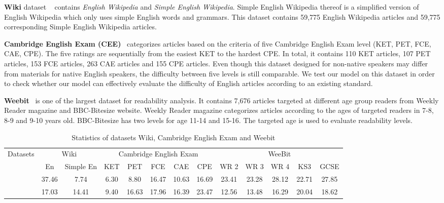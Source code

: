 \documentclass[runningheads]{llncs}
\begin{document}
 \textbf{Wiki} dataset ~\cite{wikidata} contains \emph{English Wikipedia} and \emph{Simple English Wikipedia}. Simple English Wikipedia thereof is a simplified version of English Wikipedia which only uses simple English words and grammars. This dataset contains 59,775 English Wikipedia articles and 59,775 corresponding Simple English Wikipedia articles.

 \textbf{Cambridge English Exam (CEE)}~\cite{CambridgeData} categorizes articles based on the criteria of five Cambridge English Exam level  (KET, PET, FCE, CAE, CPE). The five ratings are sequentially from the easiest KET to the hardest CPE. In total, it contains 110 KET articles, 107 PET articles, 153 FCE articles,  263 CAE articles and 155 CPE articles. 
 Even though this dataset designed for non-native speakers may differ from materials for native English speakers, the difficulty between five levels is still comparable.
 We test our model on this dataset in order to check whether our model can effectively evaluate the difficulty of English articles according to an existing standard.

\textbf{Weebit}~\cite{weebit} is one of the largest dataset for readability analysis. It contains 7,676 articles targeted at different age group readers from Weekly Reader magazine and BBC-Bitesize website. Weekly Reader magazine categorizes articles according to the ages of targeted readers in 7-8, 8-9 and 9-10 years old. BBC-Bitesize has two levels for age 11-14 and 15-16. The targeted age is used to evaluate readability levels.

\begin{table*}
	\centering
	\small
	\begin{tabular}{c|cc|ccccc|ccccc}
		\multirow{2}{*}{Datasets}&\multicolumn{2}{c|}{{Wiki}}&\multicolumn{5}{c|}{Cambridge English Exam}&\multicolumn{5}{c}{WeeBit}\\
		\cline{2-13}
		&En & \scriptsize{Simple} En & KET & PET  & FCE  & CAE & CPE& WR 2 & WR 3 & WR 4 & KS3 &GCSE   \\
		\hline
		 & 37.46 &7.74 & 6.30  &8.80 & 16.47 & 10.63 & 16.69  &23.41 & 23.28 & 28.12 & 22.71 & 27.85 \\
		\hline
		 & 17.03& 14.41 &9.40 & 16.63 & 17.96 & 16.39 & 23.47   &12.56 & 13.48 & 16.29 & 20.04 & 18.62\\
		\hline
	\end{tabular}
	\caption{Statistics of datasets {Wiki}, {Cambridge English Exam} and {Weebit} }\label{tb:stat}
	\vspace{-0.5cm}
\end{table*}
\end{document}
